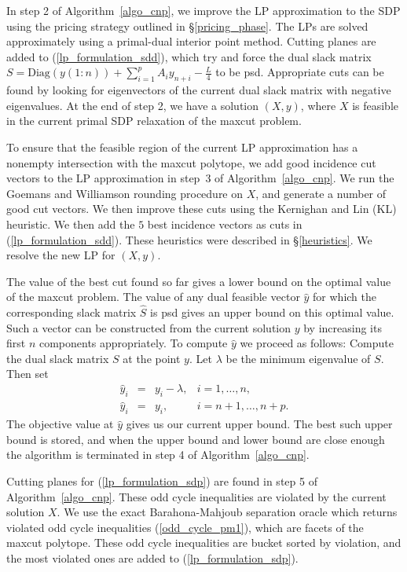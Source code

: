 \documentclass[12pt]{article}
\begin{document}
In step 2  of Algorithm~\ref{algo_cnp}, we improve the LP approximation to the
SDP using the pricing strategy outlined in \S\ref{pricing_phase}.
The LPs are solved approximately using a primal-dual interior
point method. Cutting planes are added to
(\ref{lp_formulation_sdd}), which try and force the dual slack
matrix $ S = \mbox{Diag}(y(1:n)) + \displaystyle
\sum_{i=1}^{p}A_iy_{n+i} - \frac{L}{4} $ to be psd. Appropriate
cuts can be found by looking for eigenvectors of the current dual
slack matrix with negative eigenvalues. At the end of step 2, we
have a solution $(X,y)$, where $X$ is feasible in the current
primal SDP relaxation of the maxcut problem.

To ensure that the feasible region of the current LP approximation
has a nonempty intersection with the maxcut polytope, we add good
incidence cut vectors to the LP approximation in step~3 of Algorithm~\ref{algo_cnp}. We run
the Goemans and Williamson rounding procedure on $X$, and generate
a number of good cut vectors. We then improve these cuts using the
Kernighan and Lin (KL) heuristic. We then add the $5$ best
incidence vectors as cuts in (\ref{lp_formulation_sdd}). These
heuristics were described in \S\ref{heuristics}. We resolve the
new LP for $(X,y)$.

The value of the best cut found so far gives a lower bound on the
optimal value of the maxcut problem. The value of any dual
feasible vector $\hat{y}$ for which the corresponding slack matrix
$\hat{S}$ is psd gives an upper bound on this optimal value. Such
a vector can be constructed from the current solution $y$ by
increasing its first $n$ components appropriately.  To compute
$\hat{y}$ we proceed as follows:  Compute the dual slack matrix
$S$ at the point $y$. Let $\lambda$ be the minimum eigenvalue of
$S$. Then set
\begin{displaymath}
\begin{array}{cccc}
\hat{y}_i & = & y_i - \lambda, & i=1,\ldots,n, \\
\hat{y}_i & = & y_i, & i=n+1,\ldots,n+p. \end{array}
\end{displaymath}
The objective value at $\hat{y}$ gives us our current upper bound.
The best such upper bound is stored, and when the upper bound and
lower bound are close enough the algorithm is terminated in step
4 of Algorithm~\ref{algo_cnp}.

Cutting planes for (\ref{lp_formulation_sdp}) are found in step 5
of Algorithm~\ref{algo_cnp}.
These odd cycle inequalities are violated by the current solution
$X$. We use the exact Barahona-Mahjoub separation oracle which
returns violated odd cycle inequalities (\ref{odd_cycle_pm1}),
which are facets of the maxcut polytope. These odd cycle
inequalities are bucket sorted by violation, and the most violated
ones are added to (\ref{lp_formulation_sdp}).
\end{document}
